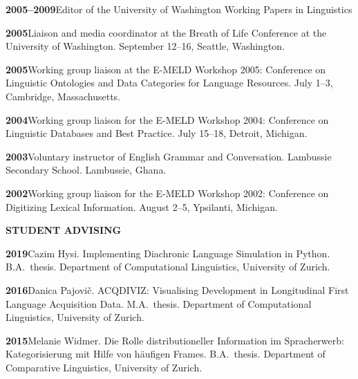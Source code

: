 \documentclass[11pt]{article}
\newcommand{\hangpara}{
 \setlength{\parindent}{0in} %
 \hangindent=0.42in %
}
\begin{document}
\vskip 6pt
\hangpara
{\bf 2005--2009}\hspace{1ex}Editor of the University of Washington Working Papers in Linguistics

\vskip 6pt
\hangpara
{\bf 2005}\hspace{1ex}Liaison and media coordinator at the Breath of Life Conference at the University of Washington. September 12--16, Seattle, Washington.

\vskip 6pt
\hangpara
{\bf 2005}\hspace{1ex}Working group liaison at the E-MELD Workshop 2005: Conference on Linguistic Ontologies and Data Categories for Language Resources. July 1--3, Cambridge, Massachusetts.

\vskip 6pt
\hangpara
{\bf 2004}\hspace{1ex}Working group liaison for the E-MELD Workshop 2004: Conference on Linguistic Databases and Best Practice. July 15--18, Detroit, Michigan.

\vskip 6pt
\hangpara
{\bf 2003}\hspace{1ex}Voluntary instructor of English Grammar and Conversation. Lambussie Secondary School. Lambussie, Ghana.

\vskip 6pt
\hangpara
{\bf 2002}\hspace{1ex}Working group liaison for the E-MELD Workshop 2002: Conference on Digitizing Lexical Information. August 2--5, Ypsilanti, Michigan.

\vskip 20pt
\begin{flushleft}
{\bf STUDENT ADVISING}
\end{flushleft}

\hangpara
{\bf 2019}\hspace{1ex}Cazim Hysi. Implementing Diachronic Language Simulation in Python. B.A.\ thesis. Department of Computational Linguistics, University of Zurich.

\hangpara
\vskip 6pt
{\bf 2016}\hspace{1ex}Danica Pajovi{\v c}. ACQDIVIZ: Visualising Development in Longitudinal First Language Acquisition Data. M.A.\ thesis. Department of Computational Linguistics, University of Zurich.

\vskip 6pt
\hangpara
{\bf 2015}\hspace{1ex}Melanie Widmer. Die Rolle distributioneller Information im Spracherwerb: Kategorisierung mit Hilfe von h{\"a}ufigen Frames. B.A.\ thesis. Department of Comparative Linguistics, University of Zurich.

\end{document}
